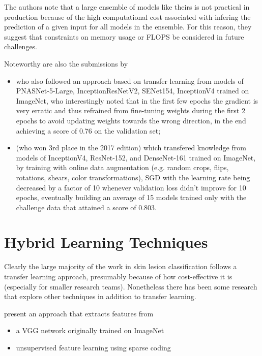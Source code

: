 The authors note that a large ensemble of models like theirs is not practical in production because of the high computational cost associated with infering the prediction of a given input for all models in the ensemble. For this reason, they suggest that constraints on memory usage or \ac{FLOPS} be considered in future challenges.

Noteworthy are also the submissions by

\begin{itemize}
    \item \citeauthor{isic2018milton} \cite{isic2018milton} who also followed an approach based on transfer learning from models of PNASNet-5-Large, InceptionResNetV2, SENet154, InceptionV4 trained on ImageNet, who interestingly noted that in the first few epochs the gradient is very erratic and thus refrained from fine-tuning weights during the first 2 epochs to avoid updating weights towards the wrong direction, in the end achieving a score of 0.76 on the validation set;
    \item \citeauthor{isic2018bissoto} \cite{isic2018bissoto} (who won 3rd place in the 2017 edition) which transfered knowledge from models of InceptionV4, ResNet-152, and DenseNet-161 trained on ImageNet, by training with online data augmentation (e.g. random crops, flips, rotations, shears, color transformations), \ac{SGD} with the learning rate being decreased by a factor of 10 whenever validation loss didn't improve for 10 epochs, eventually building an average of 15 models trained only with the challenge data that attained a score of 0.803.
\end{itemize}

\section{Hybrid Learning Techniques}

Clearly the large majority of the work in skin lesion classification follows a transfer learning approach, presumably because of how cost-effective it is (especially for smaller research teams). Nonetheless there has been some research that explore other techniques in addition to transfer learning.

\citeauthor{hybrid2} \cite{hybrid2} present an approach that extracts features from

\begin{itemize}
    \item a \ac{VGG} network originally trained on ImageNet
    \item unsupervised feature learning using sparse coding
\end{itemize}

